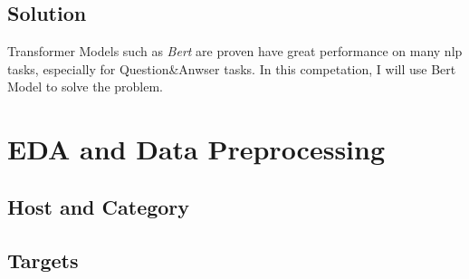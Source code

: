 \subsection{Solution}
Transformer Models such as \textit{Bert} are proven have great performance on many nlp tasks, especially for Question\&Anwser tasks.
In this competation, I will use Bert Model to solve the problem.
\newpage
\section{EDA and Data Preprocessing} \label{sec-eda}
\subsection{Host and Category}
\subsection{Targets}
